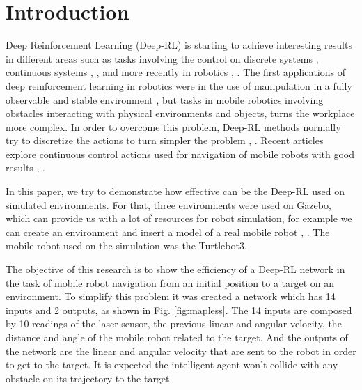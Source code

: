 \section{Introduction}
Deep Reinforcement Learning (Deep-RL) is starting to achieve interesting results in different areas such as tasks involving the control on discrete systems \cite{mnih2013playing}, \cite{schaul2015prioritized} continuous systems \cite{lillicrap2015continuous}, \cite{schulman2015high}, %
and more recently in robotics \cite{gu2017deep}, \cite{mahmood2018benchmarking}.
The first applications of deep reinforcement learning in robotics were in the use of manipulation in a  fully observable and stable environment \cite{gu2016continuous}, but tasks in mobile robotics involving obstacles interacting with physical environments and objects, turns the workplace more complex.
In order to overcome this problem, Deep-RL methods normally try to discretize the actions to turn simpler the problem \cite{zhu2017target}, \cite{tai2016towards}.
Recent articles explore continuous control actions used for navigation of mobile robots with good results \cite{tai2017virtual}, \cite{chen2017socially}.

In this paper, we try to demonstrate how effective can be the Deep-RL used on simulated environments.
For that, three environments were used on Gazebo, which can provide us with a lot of resources for robot simulation, for example we can create an environment and insert a model of a real mobile robot \cite{fairchild2016ros}, \cite{joseph2015mastering}. 
The mobile robot used on the simulation was the Turtlebot3.

The objective of this research is to show the efficiency of a Deep-RL network in the task of mobile robot navigation from an initial position to a target on an environment.
To simplify this problem it was created a network which has 14 inputs and 2 outputs, as shown in Fig. \ref{fig:mapless}.
The 14 inputs are composed by 10 readings of the laser sensor, the previous linear and angular velocity, the distance and angle of the mobile robot related to the target.
And the outputs of the network are the linear and angular velocity that are sent to the robot in order to get to the target.
It is expected the intelligent agent won't collide with any obstacle on its trajectory to the target.

